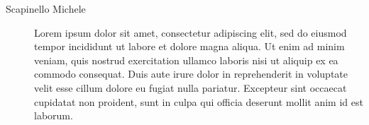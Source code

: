 \begin{description}
	\item[Scapinello Michele] Lorem ipsum dolor sit amet, consectetur adipiscing elit, sed do eiusmod tempor incididunt ut labore et dolore magna aliqua. Ut enim ad minim veniam, quis nostrud exercitation ullamco laboris nisi ut aliquip ex ea commodo consequat. Duis aute irure dolor in reprehenderit in voluptate velit esse cillum dolore eu fugiat nulla pariatur. Excepteur sint occaecat cupidatat non proident, sunt in culpa qui officia deserunt mollit anim id est laborum.

\end{description}
